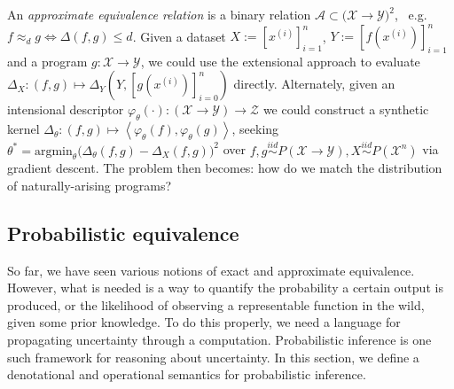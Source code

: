 \documentclass[11pt]{article}
\begin{document}
    \noindent An \textit{approximate equivalence relation} is a binary relation $\mathcal{A} \subset \mathcal (\mathcal X → \mathcal Y)^2$,~ e.g. $f \approx_{d} g \Leftrightarrow \mathbb \Delta(f, g) \leq d$. Given a dataset $X := [x^{(i)}]_{i=1}^n$, $Y := [f(x^{(i)})]_{i=1}^n$ and a program $g: \mathcal{X} → \mathcal{Y}$, we could use the extensional approach to evaluate $\Delta_X: (f, g) \mapsto \Delta_Y(Y, [g(x^{(i)})]_{i=0}^n)$ directly. Alternately, given an intensional descriptor $\varphi_θ(\cdot): (\mathcal X → \mathcal Y) → \mathcal Z$ we could construct a synthetic kernel $\Delta_θ: (f, g) \mapsto \left<\varphi_θ(f), \varphi_θ(g)\right>$, seeking $θ^* = \text{argmin}_θ\big(\Delta_θ(f, g) - \Delta_X(f, g)\big)^2$ over $f, g \overset{iid}{\sim} P(\mathcal X → \mathcal Y), X \overset{iid}{\sim} P(\mathcal X^n)$ via gradient descent. The problem then becomes: how do we match the distribution of naturally-arising programs?




    \pagebreak\subsection{Probabilistic equivalence}\label{sec:pr-eq}

    So far, we have seen various notions of exact and approximate equivalence. However, what is needed is a way to quantify the probability a certain output is produced, or the likelihood of observing a representable function in the wild, given some prior knowledge. To do this properly, we need a language for propagating uncertainty through a computation. Probabilistic inference is one such framework for reasoning about uncertainty. In this section, we define a denotational and operational semantics for probabilistic inference. \\
\end{document}
